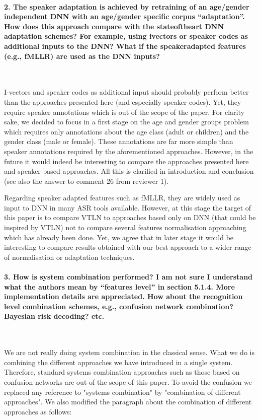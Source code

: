 \documentclass[]{article}
\begin{document}
\paragraph{2. The speaker adaptation is achieved by retraining of an age/gender independent DNN with an age/gender specific corpus “adaptation”. How does this approach compare with the stateoftheart DNN adaptation schemes? For example, using ivectors or speaker codes as additional inputs to the DNN? What if the speakeradapted features (e.g., fMLLR) are used as the DNN inputs?}

~

I-vectors and speaker codes as additional input should probably perform better than the approaches presented here (and especially speaker codes). Yet, they require speaker annotations which is out of the scope of the paper. For clarity sake, we decided to focus in a first stage on the age and gender groups problem which requires only annotations about the age class (adult or children) and the gender class (male or female). These annotations are far more simple than speaker annotations required by the aforementioned approaches. However, in the future it would indeed be interesting to compare the approaches presented here and speaker based approaches. All this is clarified in introduction and conclusion (see also the answer to comment 26 from reviewer 1).

Regarding speaker adapted features such as fMLLR, they are widely used as input to DNN in many ASR tools available. However, at this stage the target of this paper is to compare VTLN to approaches based only on DNN (that could be inspired by VTLN) not to compare several features normalisation approaching which has already been done. Yet, we agree that in later stage it would be interesting to compare results obtained with our best approach to a wider range of normalisation or adaptation techniques.

\paragraph{3. How is system combination performed? I am not sure I understand what the authors mean by “features level” in section 5.1.4. More implementation details are appreciated. How about the recognition level combination schemes, e.g., confusion network combination? Bayesian risk decoding? etc.}

~

We are not really doing system combination in the classical sense. What we do is combining the different approaches we have introduced in a single system. Therefore, standard systems combination approaches such as those based on confusion networks are out of the scope of this paper. To avoid the confusion we replaced any reference to "systems combination" by "combination of different approaches". We also modified the paragraph about the combination of different approaches as follows:
\end{document}

